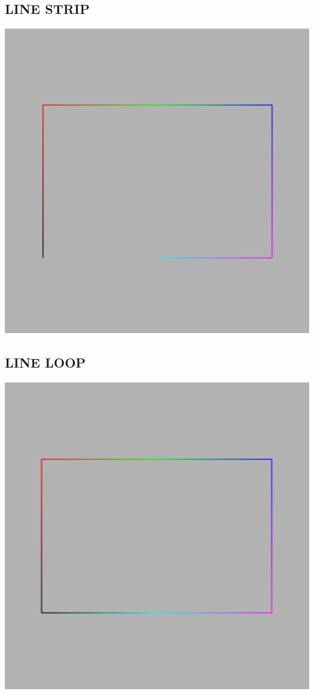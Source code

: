 \documentclass{report}
\begin{document}
\subsection{LINE STRIP}
\includegraphics[width=1.0\textwidth]{Image_0}
\subsection{LINE LOOP}
\includegraphics[width=1.0\textwidth]{Image_2}
\end{document}
